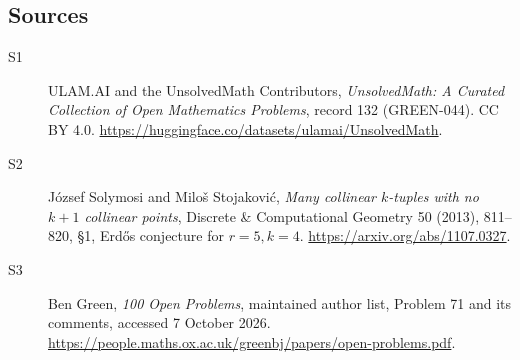 \documentclass[11pt]{article}
\begin{document}
\subsection{Sources}
\begin{description}
\item[\hypertarget{source:132:1}{S1}] ULAM.AI and the UnsolvedMath Contributors, \emph{UnsolvedMath: A Curated Collection of Open Mathematics Problems}, record 132 (GREEN-044). CC BY 4.0. \url{https://huggingface.co/datasets/ulamai/UnsolvedMath}.
\item[\hypertarget{source:132:2}{S2}] József Solymosi and Miloš Stojaković, \emph{Many collinear $k$-tuples with no $k+1$ collinear points}, Discrete \& Computational Geometry 50 (2013), 811--820, §1, Erdős conjecture for $r=5,k=4$. \url{https://arxiv.org/abs/1107.0327}.
\item[\hypertarget{source:132:3}{S3}] Ben Green, \emph{100 Open Problems}, maintained author list, Problem 71 and its comments, accessed 7 October 2026. \url{https://people.maths.ox.ac.uk/greenbj/papers/open-problems.pdf}.
\end{description}
\label{end:132}
\end{document}
